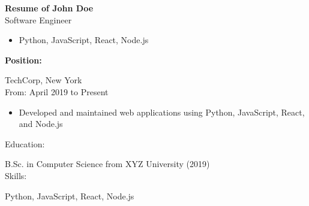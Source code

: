 \documentclass[12pt]{article}
\begin{document}
\noindent\LARGE{\textbf{Resume of John Doe}} \\
\vspace{0.05in}
\noindent\large{Software Engineer}

\vspace{0.1in}

\hrulefill

\begin{itemize}
  \item Python, JavaScript, React, Node.js
\end{itemize}

\vspace{0.05in}
\textbf{\Large Position:}

TechCorp, New York \\
From: April 2019 to Present

\begin{itemize}
  \item Developed and maintained web applications using Python, JavaScript, React, and Node.js
\end{itemize}

\vfill

Education:

B.Sc. in Computer Science from XYZ University (2019) \\

Skills:

Python, JavaScript, React, Node.js
\end{document}
